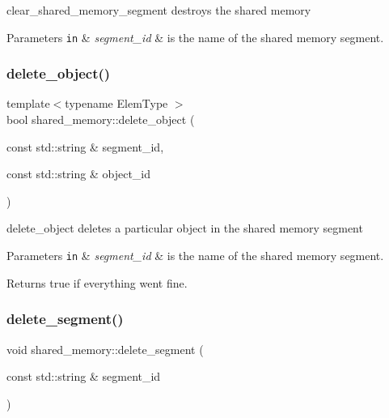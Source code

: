 clear\+\_\+shared\+\_\+memory\+\_\+segment destroys the shared memory 


\begin{DoxyParams}[1]{Parameters}
\mbox{\tt in}  & {\em segment\+\_\+id} & is the name of the shared memory segment. \\
\hline
\end{DoxyParams}
\mbox{\label{namespaceshared__memory_a7b43b29fa0aa6a5cad0ca47afdd03e83}} 
\subsubsection{\texorpdfstring{delete\+\_\+object()}{delete\_object()}}
{\footnotesize\ttfamily template$<$typename Elem\+Type $>$ \\
bool shared\+\_\+memory\+::delete\+\_\+object (\begin{DoxyParamCaption}\item[{const std\+::string \&}]{segment\+\_\+id,  }\item[{const std\+::string \&}]{object\+\_\+id }\end{DoxyParamCaption})}



delete\+\_\+object deletes a particular object in the shared memory segment 


\begin{DoxyParams}[1]{Parameters}
\mbox{\tt in}  & {\em segment\+\_\+id} & is the name of the shared memory segment. \\
\hline
\end{DoxyParams}
\begin{DoxyReturn}{Returns}
true if everything went fine. 
\end{DoxyReturn}
\mbox{\label{namespaceshared__memory_a60cbce63ae7fb64a2758b773f9006471}} 
\subsubsection{\texorpdfstring{delete\+\_\+segment()}{delete\_segment()}}
{\footnotesize\ttfamily void shared\+\_\+memory\+::delete\+\_\+segment (\begin{DoxyParamCaption}\item[{const std\+::string \&}]{segment\+\_\+id }\end{DoxyParamCaption})}



